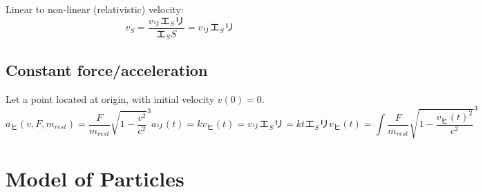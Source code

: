 \documentclass[preprint]{ptephy_v1}%
\newcommand{\jp}[1]{#1}
\newcommand{\jp}[1]{\text{#1}}
\begin{document}
Linear to non-linear (relativistic) velocity:
\begin{equation}
    v_S=\frac{v_\jp{リ}\jp{エ}_S\jp{リ}}{\jp{エ}_SS}=v_\jp{リ}\jp{エ}_S\jp{リ}
\end{equation}

\subsection{Constant force/acceleration}
Let a point located at origin, with initial velocity $v(0)=0$.
\begin{subequations}
    \begin{equation}
        a_\jp{ヒ}(v, F, m_{rest})=\frac{F}{m_{rest}}\sqrt{1-\frac{v^2}{c^2}}^3
    \end{equation}
    \begin{equation}
        a_\jp{リ}(t)=k
    \end{equation}
    \begin{equation}
        v_\jp{ヒ}(t)=v_\jp{リ}\jp{エ}_S\jp{リ}=kt\jp{エ}_S\jp{リ}
    \end{equation}
    \begin{equation}
        v_\jp{ヒ}(t)=\int \frac{F}{m_{rest}}\sqrt{1-\frac{v_\jp{ヒ}(t)^2}{c^2}}^3
    \end{equation}
\end{subequations}


\section{Model of Particles}
\end{document}
